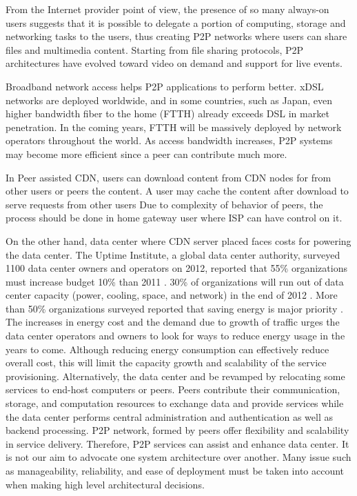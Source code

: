\documentclass[JIP]{ipsj}
\begin{document}
From the Internet provider point of view, the presence of so many always-on users suggests that it is possible to delegate a portion of computing, storage and networking tasks to the users, thus creating P2P networks where users can share files and multimedia content.
Starting from file sharing protocols, P2P architectures have evolved toward video on demand and support for live events.

Broadband network access helps P2P applications to perform better.
xDSL networks are deployed worldwide, and in some countries, such as Japan, even higher bandwidth fiber to the home (FTTH) already exceeds DSL in market penetration.  In the coming years, FTTH will be massively deployed by network operators throughout the world.  
As access bandwidth increases, P2P systems may become more efficient since a peer can contribute much more.

In Peer assisted CDN, users can download content from CDN nodes for from other users or peers the content.
A user may cache the content after download to serve requests from other users
Due to complexity of behavior of peers, the process should be done in home gateway user where ISP can have control on it. 

On the other hand, data center where CDN server placed faces costs for powering the data center.
The Uptime Institute, a global data center authority, surveyed 1100 data center owners and operators on 2012, reported that 55\% organizations must increase budget 10\% than 2011 \cite{uptime}.  
30\% of organizations will run out of data center capacity (power, cooling, space, and network) in the end of 2012 \cite{uptime}. 
More than 50\% organizations surveyed reported that saving energy is major priority \cite{uptime}.
The increases in energy cost and the demand due to growth of traffic urges the data center operators and owners to look for ways to reduce energy usage in the years to come.
Although reducing energy consumption can effectively reduce overall cost, this will limit the capacity growth and scalability of the service provisioning.
Alternatively, the data center and be revamped by relocating some services to end-host computers or peers.
Peers contribute their communication, storage, and computation resources to exchange data and provide services while the data center performs central administration and authentication as well as backend processing.
P2P network, formed by peers offer flexibility and scalability in service delivery.
Therefore, P2P services can assist and enhance data center.
It is not our aim to advocate one system architecture over another.
Many issue such as manageability, reliability, and ease of deployment must be taken into account when making high level architectural decisions.
\end{document}
